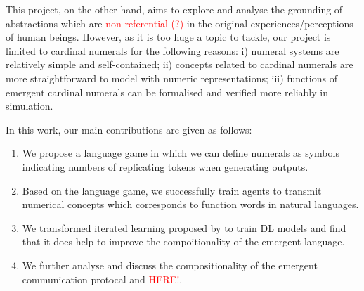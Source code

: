 This project, on the other hand, aims to explore and analyse the grounding of abstractions which are \textcolor{red}{non-referential (?)} in the original experiences/perceptions of human beings. However, as it is too huge a topic to tackle, our project is limited to cardinal numerals for the following reasons: i) numeral systems are relatively simple and self-contained\cite{james1999numeral}; ii) concepts related to cardinal numerals are more straightforward to model with numeric representations; iii) functions of emergent cardinal numerals can be formalised and verified more reliably in simulation.

In this work, our main contributions are given as follows:

\begin{enumerate}
  \item We propose a language game in which we can define numerals as symbols indicating numbers of replicating tokens when generating outputs.
  \item Based on the language game, we successfully train agents to transmit numerical concepts which corresponds to function words in natural languages.
  \item We transformed iterated learning proposed by \cite{smith2003iterated} to train DL models and find that it does help to improve the compoitionality of the emergent language.
  \item We further analyse and discuss the compositionality of the emergent communication protocal and \textcolor{red}{HERE!}.
\end{enumerate}
